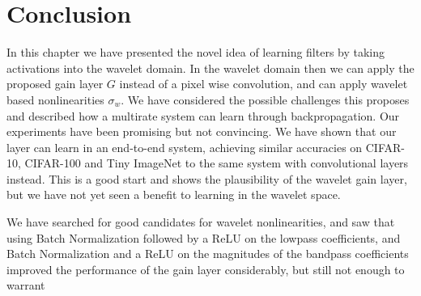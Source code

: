 \section{Conclusion}
In this chapter we have presented the novel idea of learning filters by taking
activations into the wavelet domain. In the wavelet domain then we can apply
the proposed gain layer $G$ instead of a pixel wise convolution, and can apply
wavelet based nonlinearities $\sigma_w$. We have considered the possible
challenges this proposes and described how a multirate system can learn through
backpropagation. 
Our experiments have been promising but not convincing. We have shown that our layer can learn in an
end-to-end system, achieving similar accuracies on CIFAR-10, CIFAR-100 and Tiny
ImageNet to the same system with convolutional layers instead. This is a good
start and shows the plausibility of the wavelet gain layer, but we have not yet
seen a benefit to learning in the wavelet space. 

We have searched for good candidates for wavelet nonlinearities, and saw that
using Batch Normalization followed by a ReLU on the lowpass coefficients, and
Batch Normalization and a ReLU on the magnitudes of the bandpass coefficients
improved the performance of the gain layer considerably, but still not enough to
warrant 
